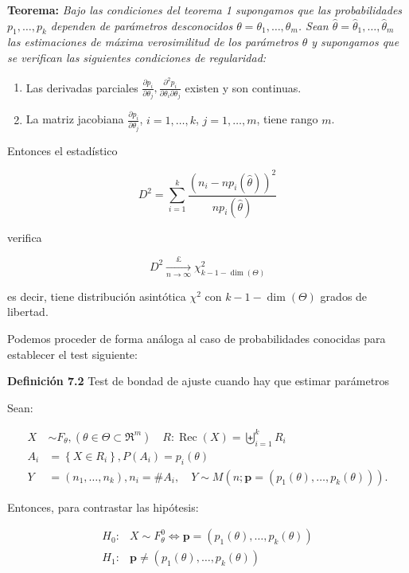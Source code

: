\documentclass[
]{article}
\providecommand{\tightlist}{%
  \setlength{\itemsep}{0pt}\setlength{\parskip}{0pt}}
\begin{document}
\textbf{Teorema:} \emph{Bajo las condiciones del teorema 1 supongamos que las probabilidades \(p_{1}, \ldots, p_{k}\) dependen de parámetros desconocidos \(\theta=\theta_{1}, \ldots, \theta_{m}\). Sean \(\hat{\theta}=\hat{\theta}_{1}, \ldots, \hat{\theta}_{m}\) las estimaciones de máxima verosimilitud de los parámetros \(\theta\) y supongamos que se verifican las siguientes condiciones de regularidad:}

\begin{enumerate}
\def\labelenumi{\arabic{enumi}.}
\tightlist
\item
  Las derivadas parciales \(\frac{\partial p_{i}}{\partial \theta_{j}}, \frac{\partial^{2} p_{i}}{\partial \theta_{i} \partial \theta_{j}}\) existen y son continuas.
\item
  La matriz jacobiana \(\frac{\partial p_{i}}{\partial \theta_{j}}\), \(i=1, \ldots, k\), \(j=1, \ldots, m\), tiene rango \(m\).
\end{enumerate}

Entonces el estadístico

\[
D^{2}=\sum_{i=1}^{k} \frac{\left(n_{i}-n p_{i}(\hat{\theta})\right)^{2}}{n p_{i}(\hat{\theta})}
\]

verifica

\[
D^{2} \xrightarrow[n \rightarrow \infty]{£} \chi_{k-1-\operatorname{dim}(\Theta)}^{2}
\]

es decir, tiene distribución asintótica \(\chi^{2}\) con \(k-1-\operatorname{dim}(\Theta)\) grados de libertad.

Podemos proceder de forma análoga al caso de probabilidades conocidas para establecer el test siguiente:

\textbf{Definición 7.2} Test de bondad de ajuste cuando hay que estimar parámetros

Sean:

\[
\begin{aligned}
X & \sim F_{\theta},\left(\theta \in \Theta \subset \Re^{m}\right) \quad R: \operatorname{Rec}(X)=\biguplus_{i=1}^{k} R_{i} \\
A_{i} & =\left\{X \in R_{i}\right\}, P\left(A_{i}\right)=p_{i}(\theta) \\
Y & =\left(n_{1}, \ldots, n_{k}\right), n_{i}=\# A_{i}, \quad Y \sim M\left(n ; \mathbf{p}=\left(p_{1}(\theta), \ldots, p_{k}(\theta)\right)\right) .
\end{aligned}
\]

Entonces, para contrastar las hipótesis:

\[
\begin{array}{ll}
H_{0}: & X \sim F_{\theta}^{0} \Leftrightarrow \mathbf{p}=\left(p_{1}(\theta), \ldots, p_{k}(\theta)\right) \\
H_{1}: & \mathbf{p} \neq\left(p_{1}(\theta), \ldots, p_{k}(\theta)\right)
\end{array}
\]
\end{document}

